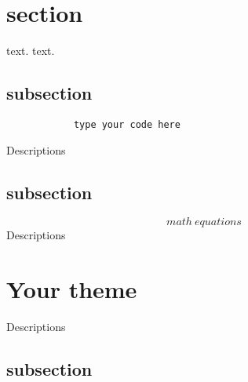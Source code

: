 \documentclass[12pt]{article}
\begin{document}
\tableofcontents


    \section*{section}
    text.
    \newline
    text.



        \subsection{subsection}
        \begin{lstlisting}
            type your code here
        \end{lstlisting}
            Descriptions

        \subsection{subsection}
        $$ 
        math\ equations
        $$
            Descriptions
    \section*{Your theme}
    Descriptions
        \subsection{subsection}
\end{document}
